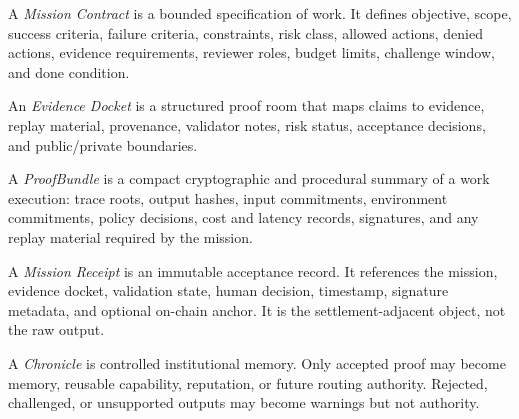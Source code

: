 \begin{definition}
A \emph{Mission Contract} is a bounded specification of work. It defines objective, scope, success criteria, failure criteria, constraints, risk class, allowed actions, denied actions, evidence requirements, reviewer roles, budget limits, challenge window, and done condition.
\end{definition}

\begin{definition}
An \emph{Evidence Docket} is a structured proof room that maps claims to evidence, replay material, provenance, validator notes, risk status, acceptance decisions, and public/private boundaries.
\end{definition}

\begin{definition}[ProofBundle]
A \emph{ProofBundle} is a compact cryptographic and procedural summary of a work execution: trace roots, output hashes, input commitments, environment commitments, policy decisions, cost and latency records, signatures, and any replay material required by the mission.
\end{definition}

\begin{definition}
A \emph{Mission Receipt} is an immutable acceptance record. It references the mission, evidence docket, validation state, human decision, timestamp, signature metadata, and optional on-chain anchor. It is the settlement-adjacent object, not the raw output.
\end{definition}

\begin{definition}[Chronicle]
A \emph{Chronicle} is controlled institutional memory. Only accepted proof may become memory, reusable capability, reputation, or future routing authority. Rejected, challenged, or unsupported outputs may become warnings but not authority.
\end{definition}

